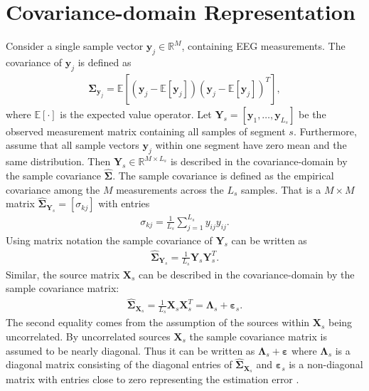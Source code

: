 \section{Covariance-domain Representation}\label{sec:cov}
Consider a single sample vector $\textbf{y}_j\in \mathbb{R}^{M}$, containing EEG measurements. 
The covariance of $\mathbf{y}_j$ is defined as
\begin{align*}
\boldsymbol{\Sigma}_{\mathbf{y}_j} = \mathbb{E}[(\mathbf{y}_j - \mathbb{E}[\mathbf{y}_j]) (\mathbf{y}_j - \mathbb{E}[\mathbf{y}_j])^T],
\end{align*}
where $\mathbb{E}[\cdot]$ is the expected value operator. 
Let $\mathbf{Y}_{s} = \left[\mathbf{y}_1, \dots, \mathbf{y}_{L_s}\right]$ be the observed measurement matrix containing all samples of segment $s$.
Furthermore, assume that all sample vectors $\mathbf{y}_j$ within one segment have zero mean and the same distribution.  
Then $\mathbf{Y}_s \in \mathbb{R}^{M \times L_s}$ is described in the covariance-domain by the sample covariance $\widehat{\boldsymbol{\Sigma}}$. 
The sample covariance is defined as the empirical covariance among the $M$ measurements across the $L_s$ samples. 
That is a $M \times M$ matrix $\widehat{\boldsymbol{\Sigma}}_{\mathbf{Y}_s} = [\sigma_{kj}]$ with entries 
\begin{align*}
\sigma_{kj} = \frac{1}{L_s} \sum_{j=1}^{L_s} y_{ij} y_{ij}.
\end{align*}
Using matrix notation the sample covariance of $\mathbf{Y}_s$ can be written as
\begin{align*}
\widehat{\boldsymbol{\Sigma}}_{\mathbf{Y}_s} = \frac{1}{L_s} \mathbf{Y}_s \mathbf{Y}_s^T.
\end{align*} 
Similar, the source matrix $\mathbf{X}_s$ can be described in the covariance-domain by the sample covariance matrix:
\begin{align*}
\widehat{\boldsymbol{\Sigma}}_{\mathbf{X}_s} = \frac{1}{L_s} \mathbf{X}_s \mathbf{X}_s^T = \boldsymbol{\Lambda}_s + \boldsymbol{\varepsilon}_s. 
\end{align*}
The second equality comes from the assumption of the sources within $\mathbf{X}_s$ being uncorrelated. 
By uncorrelated sources $\mathbf{X}_s$ the sample covariance matrix is assumed to be nearly diagonal. 
Thus it can be written as $\boldsymbol{\Lambda}_s + \boldsymbol{\varepsilon}$ where $\boldsymbol{\Lambda}_s$ is a diagonal matrix consisting of the diagonal entries of $\widehat{\boldsymbol{\Sigma}}_{\mathbf{X}_s}$ and $ \boldsymbol{\varepsilon}_s$ is a non-diagonal matrix with entries close to zero representing the estimation error \cite{Balkan2015}.


